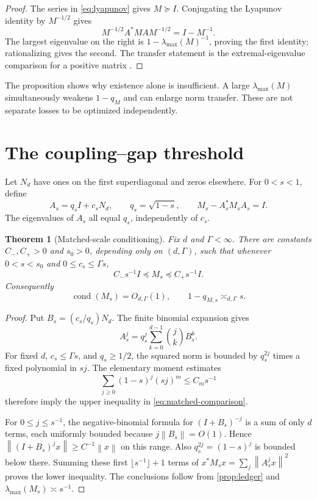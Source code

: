 \documentclass[11pt]{article}
\newtheorem{theorem}{Theorem}[section]
\newcommand{\norm}[1]{\left\lVert#1\right\rVert}
\newcommand{\cond}{\operatorname{cond}}
\begin{document}
\begin{proof}
The series in \eqref{eq:lyapunov} gives $M\succeq I$.  Conjugating the
Lyapunov identity by $M^{-1/2}$ gives
\[
 M^{-1/2}A^*MAM^{-1/2}=I-M^{-1}.
\]
The largest eigenvalue on the right is
$1-\lambda_{\max}(M)^{-1}$, proving the first identity; rationalizing gives
the second.  The transfer statement is the extremal-eigenvalue comparison
for a positive matrix \citep{HornJohnson2013}.
\end{proof}

The proposition shows why existence alone is insufficient.  A large
$\lambda_{\max}(M)$ simultaneously weakens $1-q_M$ and can enlarge norm
transfer.  These are not separate losses to be optimized independently.

\section{The coupling--gap threshold}
\label{sec:threshold}

Let $N_d$ have ones on the first superdiagonal and zeros elsewhere.  For
$0<s<1$, define
\begin{equation}
 A_s=q_sI+c_sN_d,
 \qquad q_s=\sqrt{1-s},
 \qquad M_s-A_s^*M_sA_s=I.
 \label{eq:family}
\end{equation}
The eigenvalues of $A_s$ all equal $q_s$, independently of $c_s$.

\begin{theorem}[Matched-scale conditioning]
\label{thm:matched}
Fix $d$ and $\Gamma<\infty$.  There are constants
$C_-,C_+>0$ and $s_0>0$, depending only on $(d,\Gamma)$, such that
whenever $0<s<s_0$ and $0\le c_s\le\Gamma s$,
\begin{equation}
 C_-s^{-1}I\preceq M_s\preceq C_+s^{-1}I.
 \label{eq:matched-comparison}
\end{equation}
Consequently
\begin{equation}
 \cond(M_s)=O_{d,\Gamma}(1),
 \qquad 1-q_{M,s}\asymp_{d,\Gamma}s.
 \label{eq:matched-ledger}
\end{equation}
\end{theorem}

\begin{proof}
Put $B_s=(c_s/q_s)N_d$.  The finite binomial expansion gives
\[
 A_s^j=q_s^j\sum_{k=0}^{d-1}\binom jk B_s^k.
\]
For fixed $d$, $c_s\le\Gamma s$, and $q_s\ge1/2$, the squared norm is
bounded by $q_s^{2j}$ times a fixed polynomial in $sj$.  The elementary
moment estimates
\[
 \sum_{j\ge0}(1-s)^j(sj)^m\le C_m s^{-1}
\]
therefore imply the upper inequality in \eqref{eq:matched-comparison}.

For $0\le j\le s^{-1}$, the negative-binomial formula for
$(I+B_s)^{-j}$ is a sum of only $d$ terms, each uniformly bounded because
$j\norm{B_s}=O(1)$.  Hence
$\norm{(I+B_s)^jx}\ge C^{-1}\norm x$ on this range.  Also
$q_s^{2j}=(1-s)^j$ is bounded below there.  Summing these first
$\lfloor s^{-1}\rfloor+1$ terms of
$x^*M_sx=\sum_j\norm{A_s^jx}^2$ proves the lower inequality.  The
conclusions follow from \cref{prop:ledger} and
$\lambda_{\max}(M_s)\asymp s^{-1}$.
\end{proof}
\end{document}
